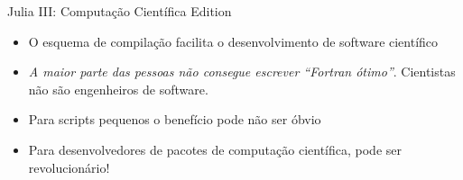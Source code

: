 \documentclass{beamer}
\begin{document}
\begin{darkframes}
\begin{frame}[fragile]
\begin{itemize}
    \end{itemize}
  \end{frame}
  
  \begin{frame}{Julia III: Computação Científica Edition}
    \begin{itemize}
    \item O esquema de compilação facilita o desenvolvimento de software científico
     \item \emph{A maior parte das pessoas não consegue escrever “Fortran ótimo”}. Cientistas não são engenheiros de software.
     \item Para scripts pequenos o benefício pode não ser óbvio
     \item Para desenvolvedores de pacotes de computação científica, pode ser revolucionário!
     \end{itemize}
   \end{frame}


\end{darkframes}
\end{document}
